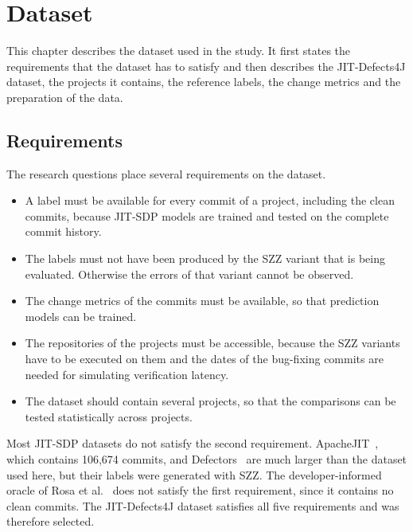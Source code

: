 \documentclass[12pt,a4paper,oneside]{report}
\begin{document}
\chapter{Dataset}\label{ch:data}

This chapter describes the dataset used in the study. It first states the
requirements that the dataset has to satisfy and then describes the
JIT-Defects4J dataset, the projects it contains, the reference labels, the
change metrics and the preparation of the data.

\section{Requirements}

The research questions place several requirements on the dataset.

\begin{itemize}[leftmargin=*]
\item A label must be available for every commit of a project, including the
clean commits, because JIT-SDP models are trained and tested on the complete
commit history.
\item The labels must not have been produced by the SZZ variant that is being
evaluated. Otherwise the errors of that variant cannot be observed.
\item The change metrics of the commits must be available, so that prediction
models can be trained.
\item The repositories of the projects must be accessible, because the SZZ
variants have to be executed on them and the dates of the bug-fixing commits
are needed for simulating verification latency.
\item The dataset should contain several projects, so that the comparisons
can be tested statistically across projects.
\end{itemize}

Most JIT-SDP datasets do not satisfy the second requirement.
ApacheJIT~\cite{keshavarz2022apachejit}, which contains 106,674 commits, and
Defectors~\cite{mahbub2023defectors} are much larger than the dataset used
here, but their labels were generated with SZZ. The developer-informed oracle
of Rosa et al.~\cite{rosa2021oracle} does not satisfy the first requirement,
since it contains no clean commits. The JIT-Defects4J dataset satisfies all
five requirements and was therefore selected.
\end{document}
